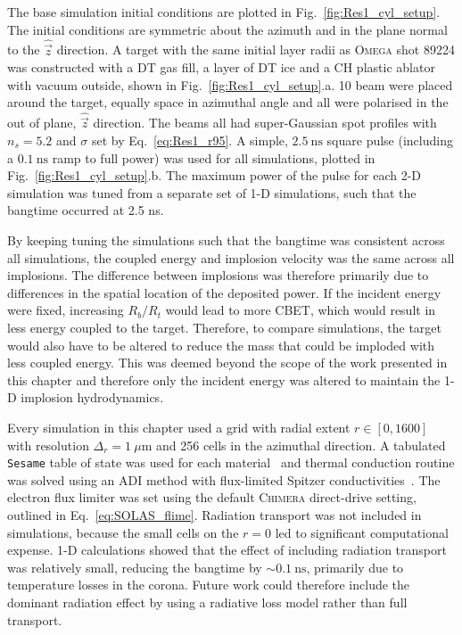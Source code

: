 The base simulation initial conditions are plotted in Fig.~\ref{fig:Res1_cyl_setup}.
The initial conditions are symmetric about the azimuth and in the plane normal to the $\hat{\vec{z}}$ direction.
A target with the same initial layer radii as \textsc{Omega} shot 89224 was constructed with a DT gas fill, a layer of DT ice and a CH plastic ablator with vacuum outside, shown in Fig.~\ref{fig:Res1_cyl_setup}.a.
10 beam were placed around the target, equally space in azimuthal angle and all were polarised in the out of plane, $\hat{\vec{z}}$ direction.
The beams all had super-Gaussian spot profiles with $n_s=5.2$ and $\sigma$ set by Eq.~\ref{eq:Res1_r95}.
A simple, $2.5\ \text{ns}$ square pulse (including a $0.1\ \text{ns}$ ramp to full power) was used for all simulations, plotted in Fig.~\ref{fig:Res1_cyl_setup}.b.
The maximum power of the pulse for each 2-D simulation was tuned from a separate set of 1-D simulations, such that the bangtime occurred at 2.5 ns.

By keeping tuning the simulations such that the bangtime was consistent across all simulations, the coupled energy and implosion velocity was the same across all implosions.
The difference between implosions was therefore primarily due to differences in the spatial location of the deposited power.
If the incident energy were fixed, increasing $R_b/R_t$ would lead to more \ac{CBET}, which would result in less energy coupled to the target.
Therefore, to compare simulations, the target would also have to be altered to reduce the mass that could be imploded with less coupled energy.
This was deemed beyond the scope of the work presented in this chapter and therefore only the incident energy was altered to maintain the 1-D implosion hydrodynamics.

Every simulation in this chapter used a grid with radial extent $r\in[0,1600]$ with resolution $\Delta_r=1\ \mu\text{m}$ and 256 cells in the azimuthal direction.
A tabulated \texttt{Sesame} table of state was used for each material~\cite{mchardy_introduction_2018} and thermal conduction routine was solved using an \ac{ADI} method with flux-limited Spitzer conductivities~\cite{peaceman_numerical_1955}.
The electron flux limiter was set using the default \textsc{Chimera} direct-drive setting, outlined in Eq.~\ref{eq:SOLAS_flime}.
Radiation transport was not included in simulations, because the small cells on the $r=0$ led to significant computational expense.
1-D calculations showed that the effect of including radiation transport was relatively small, reducing the bangtime by $\sim 0.1\ \text{ns}$, primarily due to temperature losses in the corona.
Future work could therefore include the dominant radiation effect by using a radiative loss model rather than full transport.

